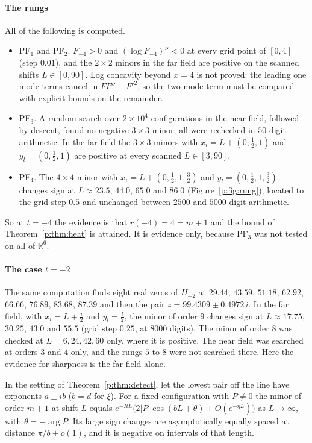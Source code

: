 \paragraph{The rungs} All of the following is computed.
\begin{itemize}
\item PF$_1$ and PF$_2$. $F_{-4}>0$ and $(\log F_{-4})''<0$ at every grid point of $[0,4]$ (step $0.01$), and the $2\times2$ minors in the far field are positive on the scanned shifts $L\in[0,90]$. Log concavity beyond $x=4$ is not proved: the leading one mode terms cancel in $FF''-F'^2$, so the two mode term must be compared with explicit bounds on the remainder.
\item PF$_3$. A random search over $2\times10^4$ configurations in the near field, followed by descent, found no negative $3\times3$ minor; all were rechecked in $50$ digit arithmetic. In the far field the $3\times3$ minors with $x_i=L+(0,\frac12,1)$ and $y_l=(0,\frac12,1)$ are positive at every scanned $L\in[3,90]$.
\item PF$_4$. The $4\times4$ minor with $x_i=L+(0,\frac12,1,\frac32)$ and $y_l=(0,\frac12,1,\frac32)$ changes sign at $L\approx23.5$, $44.0$, $65.0$ and $86.0$ (Figure~\ref{p:fig:rung}), located to the grid step $0.5$ and unchanged between $2500$ and $5000$ digit arithmetic.
\end{itemize}
So at $t=-4$ the evidence is that $r(-4)=4=m+1$ and the bound of Theorem~\ref{p:thm:heat} is attained. It is evidence only, because PF$_3$ was not tested on all of $\mathbb R^6$.

\paragraph{The case $t=-2$} The same computation finds eight real zeros of $H_{-2}$ at $29.44$, $43.59$, $51.18$, $62.92$, $66.66$, $76.89$, $83.68$, $87.39$ and then the pair $z=99.4309\pm0.4972\,i$. In the far field, with $x_i=L+\frac i2$ and $y_l=\frac l2$, the minor of order $9$ changes sign at $L\approx17.75$, $30.25$, $43.0$ and $55.5$ (grid step $0.25$, at $8000$ digits). The minor of order $8$ was checked at $L=6,24,42,60$ only, where it is positive. The near field was searched at orders $3$ and $4$ only, and the rungs $5$ to $8$ were not searched there. Here the evidence for sharpness is the far field alone.

\begin{corollary}\label{p:cor:scale}
In the setting of Theorem~\ref{p:thm:detect}, let the lowest pair off the line have exponents $a\pm ib$ ($b=d$ for $\xi$). For a fixed configuration with $P\ne0$ the minor of order $m+1$ at shift $L$ equals $e^{-RL}\big(2|P|\cos(bL+\theta)+O(e^{-\eta L})\big)$ as $L\to\infty$, with $\theta=-\arg P$. Its large sign changes are asymptotically equally spaced at distance $\pi/b+o(1)$, and it is negative on intervals of that length.
\end{corollary}

